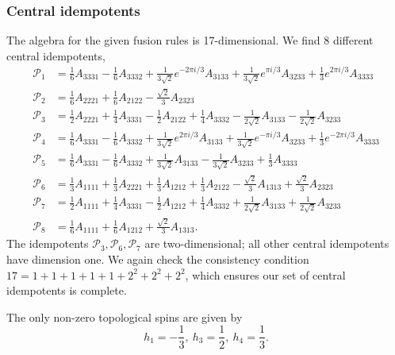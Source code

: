\documentclass[12 pt]{article}
\begin{document}
\subsubsection{Central idempotents}
The algebra for the given fusion rules is 17-dimensional. We find 8 different central idempotents,
\begin{align*}
    \mathcal{P}_1 & =\frac{1}{6}A_{3331}-\frac{1}{6}A_{3332}+\frac{1}{3\sqrt{2}}e^{-2\pi i/3}A_{3133}+\frac{1}{3\sqrt{2}}e^{\pi i/3}A_{3233}+\frac{1}{3}e^{2 \pi i/3}A_{3333}     \\
    \mathcal{P}_2 & = \frac{1}{6}A_{2221}+\frac{1}{6}A_{2122}-\frac{\sqrt{2}}{3}A_{2323}                                                                                          \\
    \mathcal{P}_3 & = \frac{1}{2}A_{2221}+\frac{1}{4}A_{3331}-\frac{1}{2}A_{2122}+\frac{1}{4}A_{3332}-\frac{1}{2\sqrt{2}}A_{3133}-\frac{1}{2\sqrt{2}}A_{3233}                     \\
    \mathcal{P}_4 & = \frac{1}{6}A_{3331}-\frac{1}{6}A_{3332}+\frac{1}{3\sqrt{2}}e^{2 \pi i /3}A_{3133}+\frac{1}{3\sqrt{2}}e^{-\pi i/3}A_{3233}+\frac{1}{3}e^{-2 \pi i/3}A_{3333} \\
    \mathcal{P}_5 & = \frac{1}{6}A_{3331}-\frac{1}{6}A_{3332}+\frac{1}{3\sqrt{2}}A_{3133}-\frac{1}{3\sqrt{2}}A_{3233}+\frac{1}{3}A_{3333}                                         \\
    \mathcal{P}_6 & =\frac{1}{3}A_{1111}+\frac{1}{3}A_{2221}+\frac{1}{3}A_{1212}+\frac{1}{3}A_{2122}-\frac{\sqrt{2}}{3}A_{1313}+\frac{\sqrt{2}}{3}A_{2323}                        \\
    \mathcal{P}_7 & =\frac{1}{2}A_{1111}+\frac{1}{4}A_{3331}-\frac{1}{2}A_{1212}+\frac{1}{4}A_{3332}+\frac{1}{2\sqrt{2}}A_{3133}+\frac{1}{2\sqrt{2}}A_{3233}                      \\
    \mathcal{P}_8 & =\frac{1}{6}A_{1111}+\frac{1}{6}A_{1212}+\frac{\sqrt{2}}{3}A_{1313}.
\end{align*}
The idempotents $\mathcal{P}_3,\mathcal{P}_6,\mathcal{P}_7$ are two-dimensional; all other central idempotents have dimension one. We again check the consistency condition $17 = 1+1+1+1+1+2^2+2^2+2^2$, which ensures our set of central idempotents is complete.

The only non-zero topological spins are given by
$$
    h_1=-\frac{1}{3}, \: h_3=\frac{1}{2}, \: h_4=\frac{1}{3}.
$$
\end{document}
